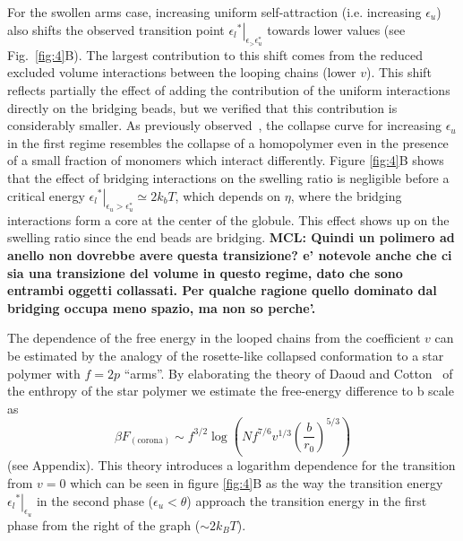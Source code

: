 \documentclass[
preprint,
a4paper,
12pt,
superscriptaddress,
pre]{revtex4}
\begin{document}
For the swollen arms case, increasing uniform self-attraction
(i.e. increasing $\epsilon_u$) also shifts the observed transition
point $\left.{\epsilon_l}^*\right|_{\epsilon_ > \epsilon_u^*}$ towards
lower values (see Fig.~\ref{fig:4}B).  The largest contribution to
this shift comes from the reduced excluded volume interactions between
the looping chains (lower $v$). This shift reflects partially the
effect of adding the contribution of the uniform interactions directly
on the bridging beads, but we verified that this contribution is
considerably smaller.
As previously observed~\cite{Dasmahapatra2006}, the collapse curve for
increasing $\epsilon_u$ in the first regime resembles the collapse of
a homopolymer even in the presence of a small fraction of monomers
which interact differently. Figure \ref{fig:4}B shows that the effect
of bridging interactions on the swelling ratio is negligible before a
critical energy $\left.{\epsilon_l}^*\right|_{\epsilon_u >
  \epsilon_u^*} \simeq 2k_bT$, which depends on $\eta$, where the
bridging interactions form a core at the center of the globule. This
effect shows up on the swelling ratio since the end beads are
bridging.
\textbf{MCL: Quindi un polimero ad anello non dovrebbe avere questa
  transizione?  e' notevole anche che ci sia una transizione del
  volume in questo regime, dato che sono entrambi oggetti
  collassati. Per qualche ragione quello dominato dal bridging occupa
  meno spazio, ma non so perche'. }


The dependence of the free energy in the looped chains from the
coefficient $v$ can be estimated by the analogy of the rosette-like
collapsed conformation to a star polymer with $f = 2 p$ ``arms''. By
elaborating the theory of Daoud and Cotton~\cite{Daoud1982} of the
enthropy of the star polymer we estimate the free-energy difference to
b scale as
\begin{equation}
\beta F_\mathrm{(corona)} \sim f^{3/2} \log\left(Nf^{7/6} v^{1/3}
  \left( \frac{b}{r_0}\right)^{5/3} \right)
\end{equation}
(see Appendix). This theory introduces a logarithm dependence for the
transition from $v = 0$ which can be seen in figure \ref{fig:4}B as
the way the transition energy
$\left.{\epsilon_l}^*\right|_{\epsilon_u}$ in the second phase
($\epsilon_u < \theta$) approach the transition energy in the first
phase from the right of the graph ($\sim 2 k_B T$).  
\end{document}
